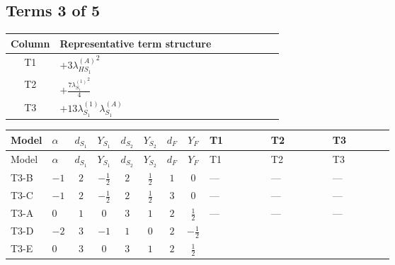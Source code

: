 \documentclass[8pt]{article}
\begin{document}
\begin{landscape}
\subsection*{Terms 3 of 5}
\begin{center}
\begin{tabular}{@{}c >{\raggedright\arraybackslash}p{0.82\linewidth}@{}}
\toprule
Column & Representative term structure \\
\midrule
T1 & \(\displaystyle +3 {\lambda_{HS_1}^{(A)}}^2\) \\
\midrule
T2 & \(\displaystyle +\frac{7 {\lambda_{S_1}^{(1)}}^2}{4}\) \\
\midrule
T3 & \(\displaystyle +13 {\lambda_{S_1}^{(1)}} {\lambda_{S_1}^{(A)}}\) \\
\midrule
\bottomrule
\end{tabular}
\end{center}
\smallskip
\tiny
\begin{longtable}{@{}llcccccc >{\raggedright\arraybackslash}p{0.21\linewidth} >{\raggedright\arraybackslash}p{0.21\linewidth} >{\raggedright\arraybackslash}p{0.21\linewidth}@{}}
\toprule
Model & $\alpha$ & $d_{S_1}$ & $Y_{S_1}$ & $d_{S_2}$ & $Y_{S_2}$ & $d_F$ & $Y_F$ & T1 & T2 & T3 \\
\midrule
\endfirsthead
\toprule
Model & $\alpha$ & $d_{S_1}$ & $Y_{S_1}$ & $d_{S_2}$ & $Y_{S_2}$ & $d_F$ & $Y_F$ & T1 & T2 & T3 \\
\midrule
\endhead
T3-B & $-1$ & $2$ & $-\frac{1}{2}$ & $2$ & $\frac{1}{2}$ & $1$ & $0$ & --- & --- & --- \\
\midrule
T3-C & $-1$ & $2$ & $-\frac{1}{2}$ & $2$ & $\frac{1}{2}$ & $3$ & $0$ & --- & --- & --- \\
\midrule
T3-A & $0$ & $1$ & $0$ & $3$ & $1$ & $2$ & $\frac{1}{2}$ & --- & --- & --- \\
\midrule
T3-D & $-2$ & $3$ & $-1$ & $1$ & $0$ & $2$ & $-\frac{1}{2}$ & \scriptsize\adjustbox{max width=\linewidth}{$\begin{gathered} +3 {\lambda_{HS_1}^{(A)}}^2\end{gathered}$} & \scriptsize\adjustbox{max width=\linewidth}{$\begin{gathered} +\frac{7 {\lambda_{S_1}^{(1)}}^2}{4}\end{gathered}$} & \scriptsize\adjustbox{max width=\linewidth}{$\begin{gathered} +13 {\lambda_{S_1}^{(1)}} {\lambda_{S_1}^{(A)}}\end{gathered}$} \\
\midrule
T3-E & $0$ & $3$ & $0$ & $3$ & $1$ & $2$ & $\frac{1}{2}$ & \scriptsize\adjustbox{max width=\linewidth}{$\begin{gathered} +3 {\lambda_{HS_1}^{(A)}}^2\end{gathered}$} & \scriptsize\adjustbox{max width=\linewidth}{$\begin{gathered} +\frac{7 {\lambda_{S_1}^{(1)}}^2}{4}\end{gathered}$} & \scriptsize\adjustbox{max width=\linewidth}{$\begin{gathered} +13 {\lambda_{S_1}^{(1)}} {\lambda_{S_1}^{(A)}}\end{gathered}$} \\

\end{longtable}
\end{landscape}
\end{document}
